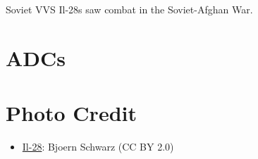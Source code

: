 Soviet VVS Il-28s saw combat in the Soviet-Afghan War.

\section{ADCs}
\begin{adclist}
\end{adclist}

\section{Photo Credit}
\begin{itemize}\raggedright
    \item \href{https://commons.wikimedia.org/wiki/File:%22Frontbomber%22_Iljuschin_Il-28_%22Beagle%22.jpg}{Il-28}: Bjoern Schwarz (CC BY 2.0)
    \end{itemize}
